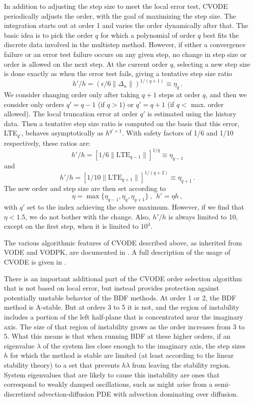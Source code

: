 In addition to adjusting the step size to meet the local error test,
CVODE periodically adjusts the order, with the goal of maximizing the
step size.  The integration starts out at order 1 and varies the order
dynamically after that.  The basic idea is to pick the order $q$ for
which a polynomial of order $q$ best fits the discrete data involved
in the multistep method.  However, if either a convergence failure or
an error test failure occurs on any given step, no change in step
size or order is allowed on the next step.  At the current order $q$,
selecting a new step size is done exactly as when the error test
fails, giving a tentative step size ratio
\[ h'/h = (\epsilon / 6 \|\Delta_n\| )^{1/(q+1)} \equiv \eta_q \, . \]
We consider changing order only after taking $q+1$ steps at order $q$,
and then we consider only orders $q' = q - 1$ (if $q > 1$) or
$q' = q + 1$ (if $q < $ max. order allowed).  The local truncation
error at order $q'$ is estimated using the history data.  Then a
tentative step size ratio is computed on the basis that this error,
LTE$_{q'}$, behaves asymptotically as $h^{q'+1}$.  With safety factors
of 1/6 and 1/10 respectively, these ratios are:
\[ h'/h = [1 / 6 \|\mbox{LTE}_{q-1}\| ]^{1/q} \equiv \eta_{q-1} \]
and
\[ h'/h = [1 / 10 \|\mbox{LTE}_{q+1}\| ]^{1/(q+2)} \equiv \eta_{q+1} \, . \]
The new order and step size are then set according to
\[ \eta = \max\{\eta_{q-1},\eta_q,\eta_{q+1}\} ~,~~ h' = \eta h \, , \]
with $q'$ set to the index achieving the above maximum.
However, if we find that $\eta < 1.5$, we do not bother with the
change.  Also, $h'/h$ is always limited to 10, except on the first
step, when it is limited to $10^4$.

The various algorithmic features of CVODE described above, as
inherited from VODE and VODPK, are documented in
\cite{BBH:89,Byr:92,Hin:00}.  A full description of the usage
of CVODE is given in \cite{HiSe:04cvode}.

There is an important additional part of the CVODE order selection
algorithm that is not based on local error, but instead provides
protection against potentially unstable behavior of the BDF methods.
At order 1 or 2, the BDF method is A-stable.  But at orders 3 to 5 it
is not, and the region of instability includes a portion of the left
half-plane that is concentrated near the imaginary axis.  The size of
that region of instability grows as the order increases from 3 to 5.
What this means is that when running BDF at these higher orders, if
an eigenvalue $\lambda$ of the system lies close enough to the
imaginary axis, the step sizes $h$ for which the method is stable are
limited (at least according to the linear stability theory) to a set
that prevents $h\lambda$ from leaving the stability region.  System
eigenvalues that are likely to cause this instability are ones that
correspond to weakly damped oscillations, such as might arise from a
semi-discretized advection-diffusion PDE with advection dominating
over diffusion.

